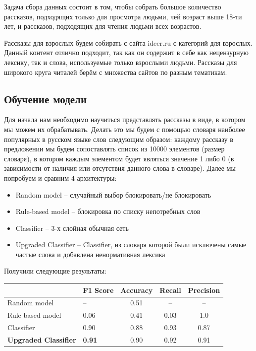 \documentclass[14pt]{matmex-diploma}
\begin{document}
        Задача сбора данных состоит в том, чтобы собрать большое количество рассказов, подходящих
        только для просмотра людьми, чей возраст выше 18-ти лет, и рассказов, подходящих для чтения 
        людьми всех возрастов.
        
        Рассказы для взрослых будем собирать с сайта ideer.ru с категорий для взрослых. Данный контент отлично подходит,
        так как он содержит в себе как нецензурную лексику, так и слова, используемые только взрослыми людьми.
        Рассказы для широкого круга читалей берём с множества сайтов по разным тематикам.
    
    \subsection{Обучение модели}
    
        Для начала нам необходимо научиться представлять рассказы в виде, в котором мы можем их обрабатывать.
        Делать это мы будем с помощью словаря наиболее популярных в русском языке слов следующим образом:
        каждому рассказу в предложении мы будем сопоставлять список из 10000 элементов (размер словаря), 
        в котором каждым элементом будет являться значение 1 либо 0 (в зависимости от наличия или отсутствия данного слова в словаре).
        Далее мы попробуем и сравним 4 архитектуры:
        
        \begin{itemize}
        	\item Random model – случайный выбор блокировать/не блокировать
        	\item Rule-based model – блокировка по списку непотребных слов
        	\item Classifier – 3-х слойная обычная сеть
        	\item Upgraded Classifier – Classifier, из словаря которой были исключены самые частые слова и добавлена ненормативная лексика
        \end{itemize}
        
        Получили следующие результаты:
        
        \begin{table}[h]
            \begin{tabular}{|l|l|c|c|c|}
            \hline
                                         & F1 Score      & Accuracy & Recall & Precision \\ \hline
            Random model                 & –             & 0.51     & –      & –         \\ \hline
            Rule-based model             & 0.06          & 0.41     & 0.03   & 1.0       \\ \hline
            Classifier                   & 0.90          & 0.88     & 0.93   & 0.87      \\ \hline
            \textbf{Upgraded Classifier} & \textbf{0.91} & 0.90     & 0.92   & 0.91      \\ \hline
            \end{tabular}
        \end{table}
        
\end{document}
